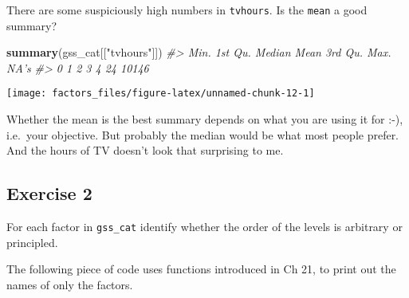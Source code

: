 \documentclass[]{book}
\newenvironment{Shaded}{\begin{snugshade}}{\end{snugshade}}
\newcommand{\CommentTok}[1]{\textcolor[rgb]{0.56,0.35,0.01}{\textit{#1}}}
\newcommand{\DataTypeTok}[1]{\textcolor[rgb]{0.13,0.29,0.53}{#1}}
\newcommand{\DecValTok}[1]{\textcolor[rgb]{0.00,0.00,0.81}{#1}}
\newcommand{\KeywordTok}[1]{\textcolor[rgb]{0.13,0.29,0.53}{\textbf{#1}}}
\newcommand{\NormalTok}[1]{#1}
\newcommand{\OperatorTok}[1]{\textcolor[rgb]{0.81,0.36,0.00}{\textbf{#1}}}
\newcommand{\StringTok}[1]{\textcolor[rgb]{0.31,0.60,0.02}{#1}}
\theoremstyle{plain}
\theoremstyle{remark}
\theoremstyle{definition}
\theoremstyle{definition}
\theoremstyle{definition}
\theoremstyle{remark}
\begin{document}
There are some suspiciously high numbers in \texttt{tvhours}. Is the
\texttt{mean} a good summary?

\begin{Shaded}
\begin{Highlighting}[]
\KeywordTok{summary}\NormalTok{(gss_cat[[}\StringTok{"tvhours"}\NormalTok{]])}
\CommentTok{#>    Min. 1st Qu.  Median    Mean 3rd Qu.    Max.    NA's }
\CommentTok{#>       0       1       2       3       4      24   10146}
\end{Highlighting}
\end{Shaded}

\begin{Shaded}
\end{Shaded}

\begin{center}\texttt{[image: factors\_files/figure-latex/unnamed-chunk-12-1]} \end{center}

Whether the mean is the best summary depends on what you are using it
for :-), i.e.~your objective. But probably the median would be what most
people prefer. And the hours of TV doesn't look that surprising to me.

\hypertarget{exercise-2-42}{%
\subsection{Exercise 2}\label{exercise-2-42}}

For each factor in \texttt{gss\_cat} identify whether the order of the
levels is arbitrary or principled.

The following piece of code uses functions introduced in Ch 21, to print
out the names of only the factors.

\begin{Shaded}
\end{Shaded}
\end{document}
